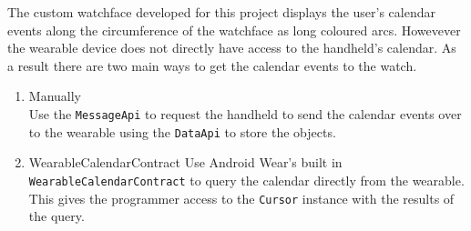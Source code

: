 The custom watchface developed for this project displays the user's calendar
events along the circumference of the watchface as long coloured arcs. Howevever
the wearable device does not directly have access to the handheld's calendar.
As a result there are two main ways to get the calendar events to the watch.
\begin{enumerate}
\item Manually\\
    Use the \texttt{MessageApi} to request the handheld to send the calendar
    events over to the wearable using the \texttt{DataApi} to store the objects.
\item WearableCalendarContract
    Use Android Wear's built in \texttt{WearableCalendarContract} to query the
    calendar directly from the wearable. This gives the programmer access to the
    \texttt{Cursor} instance with the results of the query.
\end{enumerate}

